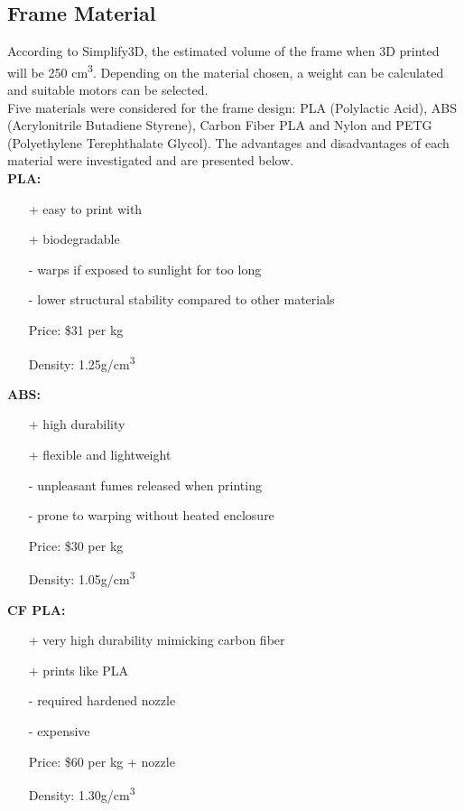 \documentclass[12pt]{article}
\begin{document}
\subsection{Frame Material}

According to Simplify3D, the estimated volume of the frame when 3D printed will be 250 cm\textsuperscript{3}. Depending on the material chosen, a weight can be calculated and suitable motors can be selected.
\\

Five materials were considered for the frame design: PLA (Polylactic Acid), ABS (Acrylonitrile Butadiene Styrene), Carbon Fiber PLA and Nylon and PETG (Polyethylene Terephthalate Glycol). The advantages and disadvantages of each material were investigated and are presented below.
\\

\vspace{5mm}
\textbf{PLA:}
\renewcommand{\labelitemi}{\textperiodcentered}
\begin{itemize}
\item[+] easy to print with
\item[+] biodegradable
\item[-] warps if exposed to sunlight for too long
\item[-] lower structural stability compared to other materials
\item[Price:] \$31 per kg 
\item[Density:] 1.25g/cm\textsuperscript{3}
\end{itemize}
\vspace{5mm}


\textbf{ABS:}
\renewcommand{\labelitemi}{\textperiodcentered}
\begin{itemize}
\item[+] high durability
\item[+] flexible and lightweight
\item[-] unpleasant fumes released when printing
\item[-] prone to warping without heated enclosure
\item[Price:] \$30 per kg
\item[Density:] 1.05g/cm\textsuperscript{3}
\end{itemize}
\vspace{5mm}

\textbf{CF PLA:}
\renewcommand{\labelitemi}{\textperiodcentered}
\begin{itemize}
\item[+] very high durability mimicking carbon fiber
\item[+] prints like PLA
\item[-] required hardened nozzle
\item[-] expensive
\item[Price:] \$60 per kg + nozzle
\item[Density:] 1.30g/cm\textsuperscript{3}
\end{itemize}
\vspace{5mm}
\end{document}
